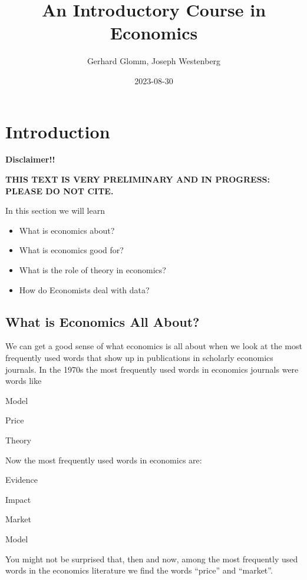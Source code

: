 \documentclass[
]{book}
\title{An Introductory Course in Economics}
\author{Gerhard Glomm, Joseph Westenberg}
\date{2023-08-30}
\providecommand{\tightlist}{%
  \setlength{\itemsep}{0pt}\setlength{\parskip}{0pt}}
\begin{document}
\maketitle

{
\setcounter{tocdepth}{1}
\tableofcontents
}
\hypertarget{intro}{%
\chapter{Introduction}\label{intro}}

\textbf{Disclaimer!!}

\textbf{THIS TEXT IS VERY PRELIMINARY AND IN PROGRESS: PLEASE DO NOT CITE.}

In this section we will learn

\begin{itemize}
\tightlist
\item
  What is economics about?
\item
  What is economics good for?
\item
  What is the role of theory in economics?
\item
  How do Economists deal with data?
\end{itemize}

\hypertarget{what-is-economics-all-about}{%
\section{What is Economics All About?}\label{what-is-economics-all-about}}

We can get a good sense of what economics is all about when we look at the most frequently used words that show up in publications in scholarly economics journals. In the 1970s the most frequently used words in economics journals were words like

\begin{center}
Model

Price

Theory

\end{center}

Now the most frequently used words in economics are:

\begin{center}
Evidence

Impact

Market

Model

\end{center}

You might not be surprised that, then and now, among the most frequently used words in the economics literature we find the words ``price'' and ``market''.
\end{document}
